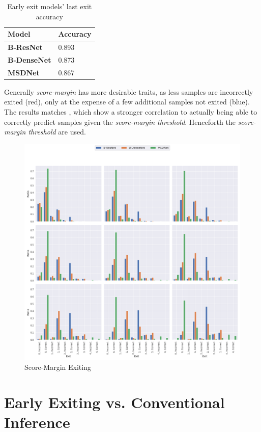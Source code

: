 \begin{longtabu}{>{\bfseries}X|X}
	\caption[Early exit models' last exit accuracy]{Early exit models' last exit accuracy}\label{tbl:earlyexitlastexit} \\
	\toprule \rowfont{\bfseries}
	Model & Accuracy \tabularnewline
	\midrule
	B-ResNet & 0.893 \tabularnewline
	B-DenseNet & 0.873 \tabularnewline
	MSDNet & 0.867 \tabularnewline
	\bottomrule
\end{longtabu}

Generally \emph{score-margin} has more desirable traits, as less samples are incorrectly exited (red), only at the expense of a few additional samples not exited ({\color{sns-blue}blue}). The results matches \cite{park_big/little_2015}, which show a stronger correlation to actually being able to correctly predict samples given the \emph{score-margin threshold}. Henceforth the \emph{score-margin threshold} are used.

\begin{figure}
	\centering
	\includegraphics[width=\linewidth]{figures/threshold_plots/inference_threshold_test}
	\caption{Score-Margin Exiting}
	\label{fig:inferencethresholdtest}
\end{figure}

\section{Early Exiting vs. Conventional Inference}

